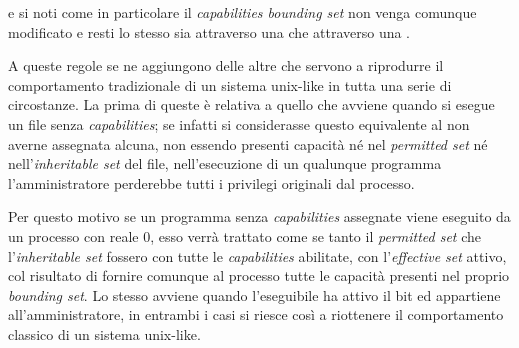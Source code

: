 

\noindent e si noti come in particolare il \textit{capabilities bounding set}
non venga comunque modificato e resti lo stesso sia attraverso una 
che attraverso una .



A queste regole se ne aggiungono delle altre che servono a riprodurre il
comportamento tradizionale di un sistema unix-like in tutta una serie di
circostanze. La prima di queste è relativa a quello che avviene quando si
esegue un file senza \textit{capabilities}; se infatti si considerasse questo
equivalente al non averne assegnata alcuna, non essendo presenti capacità né
nel \textit{permitted set} né nell'\textit{inheritable set} del file,
nell'esecuzione di un qualunque programma l'amministratore perderebbe tutti i
privilegi originali dal processo.

Per questo motivo se un programma senza \textit{capabilities} assegnate viene
eseguito da un processo con  reale 0, esso verrà trattato come
se tanto il \textit{permitted set} che l'\textit{inheritable set} fossero con
tutte le \textit{capabilities} abilitate, con l'\textit{effective set} attivo,
col risultato di fornire comunque al processo tutte le capacità presenti nel
proprio \textit{bounding set}. Lo stesso avviene quando l'eseguibile ha attivo
il  bit ed appartiene all'amministratore, in entrambi i casi si
riesce così a riottenere il comportamento classico di un sistema unix-like.

